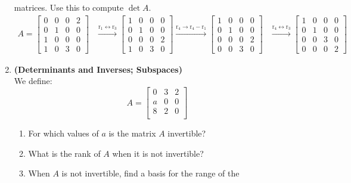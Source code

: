 \documentclass[red]{tutorial}
\newcommand{\row}[1]{\mathrm{r}_{#1}}
\newcommand{\mat}[1]{\begin{bmatrix} #1 %
\end{bmatrix}}
\theoremstyle{definition}
\theoremstyle{theorem}
\begin{document}
\begin{tutorial}
\begin{enumerate}
      matrices. Use this to compute $\det A$.
      \begin{align*}
        A = \begin{bmatrix}
          0 & 0 & 0 & 2 \\
          0 & 1 & 0 & 0 \\
          1 & 0 & 0 & 0 \\
          1 & 0 & 3 & 0
        \end{bmatrix}
        &\xrightarrow{\row{1} \leftrightarrow \row{3}}
        \begin{bmatrix}
          1 & 0 & 0 & 0 \\
          0 & 1 & 0 & 0 \\
          0 & 0 & 0 & 2 \\
          1 & 0 & 3 & 0
        \end{bmatrix}
        \xrightarrow{\row{4} \to \row{4}-\row{1}}
        \begin{bmatrix}
          1 & 0 & 0 & 0 \\
          0 & 1 & 0 & 0 \\
          0 & 0 & 0 & 2 \\
          0 & 0 & 3 & 0
        \end{bmatrix}
        &\xrightarrow{\row{4} \leftrightarrow \row{3}}
        \begin{bmatrix}
          1 & 0 & 0 & 0 \\
          0 & 1 & 0 & 0 \\
          0 & 0 & 3 & 0 \\
          0 & 0 & 0 & 2
        \end{bmatrix}
      \end{align*}
    \item \label{q:determinants} \textbf{(Determinants and Inverses; Subspaces)}\\
      We define:
      \begin{equation*}
        A =
        \mat{
          0 & 3 & 2 \\
          a & 0 & 0 \\
          8 & 2 & 0 \\
        }
      \end{equation*}
      \begin{enumerate}
        \item For which values of $a$ is the matrix $A$ invertible?
        \item What is the rank of $A$ when it is not invertible?
        \item When $A$ is not invertible, find a basis for the range of the

\end{enumerate}
\end{enumerate}
\end{tutorial}
\end{document}
